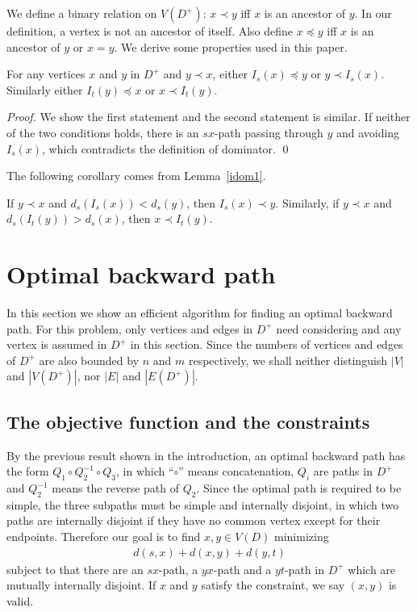 We define a binary relation on $V(D^+)$: $x\prec y$ iff $x$ is an ancestor of $y$. In our definition, a vertex is not an ancestor of itself. Also define $x\preceq y$ iff $x$ is an ancestor of $y$ or $x=y$.
We derive some properties used in this paper.

\begin{lemma}\label{idom1}
For any vertices $x$ and $y$ in $D^+$ and $y\prec x$, either $I_s(x)\preceq y$ or $y\prec I_s(x)$.
Similarly either $I_t(y)\preceq x$ or $x\prec I_t(y)$.
\end{lemma}
\begin{proof}
We show the first statement and the second statement is similar.
If neither of the two conditions holds, there is an $sx$-path passing through $y$ and avoiding $I_s(x)$, which contradicts the definition of dominator.
\qed\end{proof}

The following corollary comes from Lemma~\ref{idom1}.
\begin{corollary}\label{idom2}
If $y\prec x$ and $d_s(I_s(x))<d_s(y)$, then $I_s(x)\prec y$.
Similarly,
if $y\prec x$ and $d_s(I_t(y))>d_s(x)$, then $x\prec I_t(y)$.
\end{corollary}

\section{Optimal backward path}
In this section we show an efficient algorithm for finding an optimal backward path.
For this problem, only vertices and edges in $D^+$ need considering and any vertex is assumed in $D^+$ in this section.
Since the numbers of vertices and edges of $D^+$ are also bounded by $n$ and $m$ respectively, we shall neither distinguish $|V|$ and $|V(D^+)|$, nor $|E|$ and $|E(D^+)|$.

\subsection{The objective function and the constraints} 

By the previous result shown in the introduction, an optimal backward path has the form $Q_1\circ Q_2^{-1}\circ Q_3$, in which ``$\circ$'' means concatenation, $Q_i$ are paths in $D^+$ and $Q_2^{-1}$ means the reverse path of $Q_2$. Since the optimal path is required to be simple, the three subpaths must be simple and internally disjoint, in which two paths are internally disjoint if they have no common vertex except for their endpoints. Therefore our goal is to find $x,y\in V(D)$ minimizing 
\begin{eqnarray}
d(s,x)+d(x,y)+d(y,t)
\end{eqnarray}
subject to that there are an $sx$-path, a $yx$-path and a $yt$-path in $D^+$ which are mutually internally disjoint. 
If $x$ and $y$ satisfy the constraint, we say $(x,y)$ is valid. 

